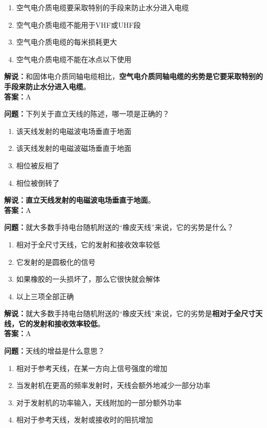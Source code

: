 \begin{enumerate}[label=\Alph*), leftmargin=1.5cm]
	\item 空气电介质电缆要采取特别的手段来防止水分进入电缆
	\item 空气电介质电缆不能用于VHF或UHF段
	\item 空气电介质电缆的每米损耗更大
	\item 空气电介质电缆不能在冰点以下使用
\end{enumerate}

\textbf{解说：}和固体电介质同轴电缆相比，\textbf{空气电介质同轴电缆的劣势是它要采取特别的手段来防止水分进入电缆}。\\\textbf{答案：}A%



\textbf{问题：}下列关于直立天线的陈述，哪一项是正确的？

\begin{enumerate}[label=\Alph*), leftmargin=1.5cm]
	\item 该天线发射的电磁波电场垂直于地面
	\item 该天线发射的电磁波磁场垂直于地面
	\item 相位被反相了
	\item 相位被倒转了
\end{enumerate}

\textbf{解说：}\textbf{直立天线发射的电磁波电场垂直于地面}。\\\textbf{答案：}A%



\textbf{问题：}就大多数手持电台随机附送的“橡皮天线”来说，它的劣势是什么？

\begin{enumerate}[label=\Alph*), leftmargin=1.5cm]
	\item 相对于全尺寸天线，它的发射和接收效率较低
	\item 它发射的是圆极化的信号
	\item 如果橡胶的一头损坏了，那么它很快就会解体
	\item 以上三项全部正确
\end{enumerate}

\textbf{解说：}就大多数手持电台随机附送的“橡皮天线”来说，它的劣势是\textbf{相对于全尺寸天线，它的发射和接收效率较低}。\\\textbf{答案：}A%



\textbf{问题：}天线的增益是什么意思？

\begin{enumerate}[label=\Alph*), leftmargin=1.5cm]
	\item 相对于参考天线，在某一方向上信号强度的增加
	\item 当发射机在更高的频率发射时，天线会额外地减少一部分功率
	\item 对于发射机的功率输入，天线附加的一部分额外功率
	\item 相对于参考天线，发射或接收时的阻抗增加
\end{enumerate}

